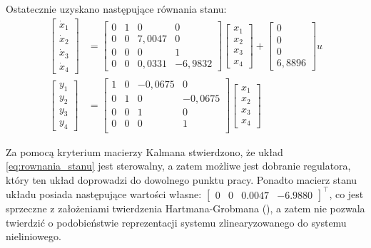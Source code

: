 Ostatecznie uzyskano następujące równania stanu:
\begin{align}
\begin{bmatrix}
    \dot{x}_1 \\ \dot{x}_2 \\ \dot{x}_3 \\ \dot{x}_4
\end{bmatrix}
&= \begin{bmatrix}
    0 & 1 & 0 & 0 \\
    0 & 0 & 7,0047 & 0 \\
    0 & 0 & 0 & 1 \\
    0 & 0 & 0,0331 & -6,9832
\end{bmatrix}
\begin{bmatrix}
    x_1 \\ x_2 \\ x_3 \\ x_4
\end{bmatrix}
+
\begin{bmatrix}
    0 \\ 0 \\ 0 \\ 6,8896
\end{bmatrix}
u \label{eq:rownania_stanu} \\%
\begin{bmatrix}
    y_1 \\ y_2 \\ y_3 \\ y_4
\end{bmatrix}
&= \begin{bmatrix}
    1 & 0 & -0,0675 & 0 \\
    0 & 1 & 0 & -0,0675 \\
    0 & 0 & 1 & 0 \\
    0 & 0 & 0 & 1 \\
\end{bmatrix}
\begin{bmatrix}
x_1 \\ x_2 \\ x_3 \\ x_4
\end{bmatrix} \label{eq:rownania_wyjscia} 
\end{align}

Za pomocą kryterium macierzy Kalmana stwierdzono, że układ \eqref{eq:rownania_stanu} jest sterowalny, a zatem możliwe jest dobranie regulatora, który ten układ doprowadzi do dowolnego punktu pracy. Ponadto macierz stanu układu posiada następujące wartości własne: $\begin{bmatrix}
0 & 0 & 0.0047 & -6.9880
\end{bmatrix}^\intercal$, co jest sprzeczne z założeniami twierdzenia Hartmana-Grobmana (\cite{TEORIASTERCW}), a zatem nie pozwala twierdzić o podobieństwie reprezentacji systemu zlinearyzowanego do systemu nieliniowego.


